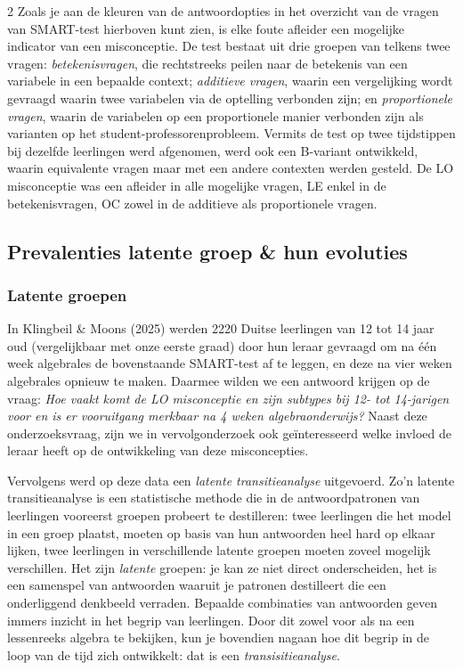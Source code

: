 \begin{multicols}{2}
Zoals je aan de kleuren van de antwoordopties in het overzicht van de vragen van SMART-test hierboven kunt zien, is elke foute afleider een mogelijke indicator van een misconceptie. De test bestaat uit drie groepen van telkens twee vragen: \textit{betekenisvragen}, die rechtstreeks peilen naar de betekenis van een variabele in een bepaalde context; \textit{additieve vragen}, waarin een vergelijking wordt gevraagd waarin twee variabelen via de optelling verbonden zijn; en \textit{proportionele vragen}, waarin de variabelen op een proportionele manier verbonden zijn als varianten op het student-professorenprobleem. Vermits de test op twee tijdstippen bij dezelfde leerlingen werd afgenomen,  werd ook een B-variant ontwikkeld, waarin equivalente vragen maar met een andere contexten werden gesteld. De LO misconceptie was een afleider in alle mogelijke vragen, LE enkel in de betekenisvragen, OC zowel in de additieve als proportionele vragen.

\subsection{Prevalenties latente groep \& hun evoluties}
\subsubsection{Latente groepen}
In Klingbeil \& Moons (2025) werden 2220 Duitse leerlingen van 12 tot 14 jaar oud (vergelijkbaar met onze eerste graad) door hun leraar gevraagd om na één week algebrales de bovenstaande SMART-test af te leggen, en deze na vier weken algebrales opnieuw te maken. Daarmee wilden we een antwoord krijgen op de vraag: \textit{Hoe vaakt komt de LO misconceptie en zijn subtypes bij 12- tot 14-jarigen voor en is er vooruitgang merkbaar na 4 weken algebraonderwijs?} Naast deze onderzoeksvraag, zijn we in vervolgonderzoek ook geïnteresseerd welke invloed de leraar heeft op de ontwikkeling van deze misconcepties. 

Vervolgens werd op deze data een \textit{latente transitieanalyse} uitgevoerd. Zo’n latente transitieanalyse is een statistische methode die in de antwoordpatronen van leerlingen vooreerst groepen probeert te destilleren: twee leerlingen die het model in een groep plaatst, moeten op basis van hun antwoorden heel hard op elkaar lijken, twee leerlingen in verschillende latente groepen moeten zoveel mogelijk verschillen. Het zijn \textit{latente} groepen: je kan ze niet direct onderscheiden, het is een samenspel van antwoorden waaruit je patronen destilleert die een onderliggend denkbeeld verraden. Bepaalde combinaties van antwoorden geven immers inzicht in het begrip van leerlingen. Door dit zowel voor als na een lessenreeks algebra te bekijken, kun je bovendien nagaan hoe dit begrip in de loop van de tijd zich ontwikkelt: dat is een \textit{transisitieanalyse}.


\end{multicols}
